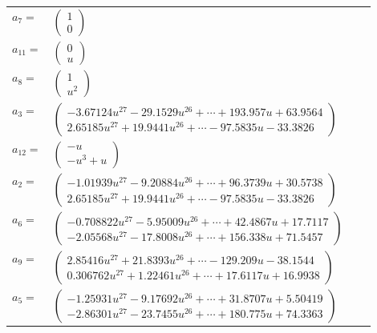 \documentclass[1p]{elsarticle_modified}
\theoremstyle{definition}
\begin{document}
\begin{tabular}{m{7pt} m{180pt} m{7pt} m{180pt} }
\flushright $a_{7}=$&$\begin{pmatrix}1\\0\end{pmatrix}$ \\
\flushright $a_{11}=$&$\begin{pmatrix}0\\u\end{pmatrix}$ \\
\flushright $a_{8}=$&$\begin{pmatrix}1\\u^2\end{pmatrix}$ \\
\flushright $a_{3}=$&$\begin{pmatrix}-3.67124 u^{27}-29.1529 u^{26}+\cdots+193.957 u+63.9564\\2.65185 u^{27}+19.9441 u^{26}+\cdots-97.5835 u-33.3826\end{pmatrix}$ \\
\flushright $a_{12}=$&$\begin{pmatrix}- u\\- u^3+u\end{pmatrix}$ \\
\flushright $a_{2}=$&$\begin{pmatrix}-1.01939 u^{27}-9.20884 u^{26}+\cdots+96.3739 u+30.5738\\2.65185 u^{27}+19.9441 u^{26}+\cdots-97.5835 u-33.3826\end{pmatrix}$ \\
\flushright $a_{6}=$&$\begin{pmatrix}-0.708822 u^{27}-5.95009 u^{26}+\cdots+42.4867 u+17.7117\\-2.05568 u^{27}-17.8008 u^{26}+\cdots+156.338 u+71.5457\end{pmatrix}$ \\
\flushright $a_{9}=$&$\begin{pmatrix}2.85416 u^{27}+21.8393 u^{26}+\cdots-129.209 u-38.1544\\0.306762 u^{27}+1.22461 u^{26}+\cdots+17.6117 u+16.9938\end{pmatrix}$ \\
\flushright $a_{5}=$&$\begin{pmatrix}-1.25931 u^{27}-9.17692 u^{26}+\cdots+31.8707 u+5.50419\\-2.86301 u^{27}-23.7455 u^{26}+\cdots+180.775 u+74.3363\end{pmatrix}$ \\

\end{tabular}
\end{document}
